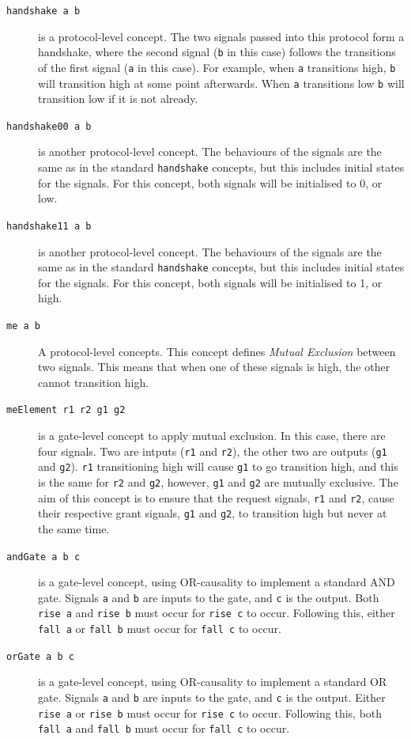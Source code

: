 \documentclass{proc}
\begin{document}
\begin{description}
  \item [\texttt{handshake a b}] is a protocol-level concept. The two signals passed into this protocol form a handshake, where the second signal (\texttt{b} in this case) follows the 
  transitions of the first signal (\texttt{a} in this case). For example, when \texttt{a} transitions high, \texttt{b} will transition high at some point afterwards. When \texttt{a} transitions 
  low \texttt{b} will transition low if it is not already.
  
  \item [\texttt{handshake00 a b}] is another protocol-level concept. The behaviours of the signals are the same as in the standard \texttt{handshake} concepts, but this includes initial 
  states for the signals. For this concept, both signals will be initialised to 0, or low.
  
  \item [\texttt{handshake11 a b}] is another protocol-level concept. The behaviours of the signals are the same as in the standard \texttt{handshake} concepts, but this includes initial 
  states for the signals. For this concept, both signals will be initialised to 1, or high.
  
  \item [\texttt{me a b}] A protocol-level concepts. This concept defines \emph{Mutual Exclusion} between two signals. 
  This means that when one of these signals is high, the other cannot transition high.
  
  \item [\texttt{meElement r1 r2 g1 g2}] is a gate-level concept to apply mutual exclusion. In this case, there are four signals. Two are intputs (\texttt{r1} and \texttt{r2}), the other two 
  are outputs (\texttt{g1} and \texttt{g2}). \texttt{r1} transitioning high will cause \texttt{g1} to go transition high, and this is the same for \texttt{r2} and \texttt{g2}, however,
  \texttt{g1} and \texttt{g2} are mutually exclusive. The aim of this concept is to ensure that the request signals, \texttt{r1} and \texttt{r2}, cause their respective grant signals, 
  \texttt{g1} and \texttt{g2}, to transition high but never at the same time. 
  
  \item [\texttt{andGate a b c}] is a gate-level concept, using OR-causality to implement a standard AND gate. Signals \texttt{a} and \texttt{b} are inputs to the gate, and \texttt{c} is the 
  output. Both \texttt{rise a} and \texttt{rise b} must occur for \texttt{rise c} to occur. Following this, either \texttt{fall a} or \texttt{fall b} must occur for \texttt{fall c} to occur.
  
  \item [\texttt{orGate a b c}] is a gate-level concept, using OR-causality to implement a standard OR gate. Signals \texttt{a} and \texttt{b} are inputs to the gate, and \texttt{c} is the 
  output. Either \texttt{rise a} or \texttt{rise b} must occur for \texttt{rise c} to occur. Following this, both \texttt{fall a} and \texttt{fall b} must occur for \texttt{fall c} to occur. 
  
\end{description}
\end{document}
